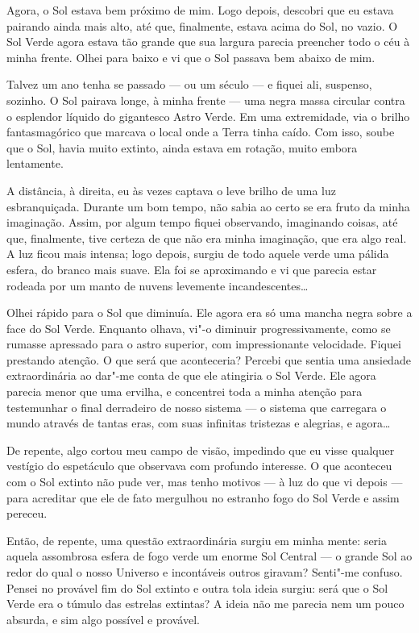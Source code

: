 Agora, o Sol estava bem próximo de mim. Logo depois, descobri que eu estava pairando ainda mais alto, até que,
finalmente, estava acima do Sol, no vazio. O Sol Verde agora estava tão grande que sua largura parecia preencher todo o
céu à minha frente. Olhei para baixo e vi que o Sol passava bem abaixo de mim.

Talvez um ano tenha se passado --- ou um século --- e fiquei ali, suspenso, sozinho. O Sol pairava longe, à minha frente ---
uma negra massa circular contra o esplendor líquido do gigantesco Astro Verde. Em uma extremidade, via o brilho
fantasmagórico que marcava o local onde a Terra tinha caído. Com isso, soube que o Sol, havia muito extinto, ainda estava
em rotação, muito embora lentamente.

A distância, à direita, eu às vezes captava o leve brilho de uma luz esbranquiçada. Durante um bom tempo, não sabia ao
certo se era fruto da minha imaginação. Assim, por algum tempo fiquei observando, imaginando coisas, até que,
finalmente, tive certeza de que não era minha imaginação, que era algo real. A luz ficou mais intensa; logo depois,
surgiu de todo aquele verde uma pálida esfera, do branco mais suave. Ela foi se aproximando e vi que parecia estar
rodeada por um manto de nuvens levemente incandescentes\ldots{}

Olhei rápido para o Sol que diminuía. Ele agora era só uma mancha negra sobre a face do Sol Verde. Enquanto
olhava, vi"-o diminuir progressivamente, como se rumasse apressado para o astro superior, com impressionante velocidade.
Fiquei prestando atenção. O que será que aconteceria? Percebi que sentia uma ansiedade extraordinária ao dar"-me
conta de que ele atingiria o Sol Verde. Ele agora parecia menor que uma ervilha, e concentrei toda a minha atenção para
testemunhar o final derradeiro de nosso sistema --- o sistema que carregara o mundo através de tantas eras, com suas
infinitas tristezas e alegrias, e agora\ldots{}

De repente, algo cortou meu campo de visão, impedindo que eu visse qualquer vestígio do espetáculo que observava com
profundo interesse. O que aconteceu com o Sol extinto não pude ver, mas tenho motivos --- à luz do que vi depois --- para
acreditar que ele de fato mergulhou no estranho fogo do Sol Verde e assim pereceu.

Então, de repente, uma questão extraordinária surgiu em minha mente: seria aquela assombrosa esfera de fogo verde um
enorme Sol Central --- o grande Sol ao redor do qual o nosso Universo e incontáveis outros giravam? Senti"-me confuso.
Pensei no provável fim do Sol extinto e outra tola ideia surgiu: será que o Sol Verde era o túmulo das estrelas
extintas? A ideia não me parecia nem um pouco absurda, e sim algo possível e provável.


